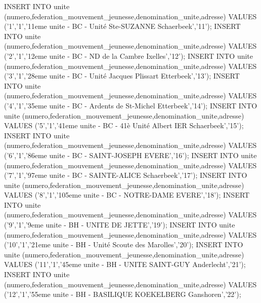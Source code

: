 INSERT INTO unite (numero,federation_mouvement_jeunesse,denomination_unite,adresse) VALUES ('1','1','11eme unite - BC - Unité Ste-SUZANNE Schaerbeek','11');
INSERT INTO unite (numero,federation_mouvement_jeunesse,denomination_unite,adresse) VALUES ('2','1','12eme unite - BC - ND de la Cambre Ixelles','12');
INSERT INTO unite (numero,federation_mouvement_jeunesse,denomination_unite,adresse) VALUES ('3','1','28eme unite - BC - Unité Jacques Plissart Etterbeek','13');
INSERT INTO unite (numero,federation_mouvement_jeunesse,denomination_unite,adresse) VALUES ('4','1','35eme unite - BC - Ardents de St-Michel Etterbeek','14');
INSERT INTO unite (numero,federation_mouvement_jeunesse,denomination_unite,adresse) VALUES ('5','1','41eme unite - BC - 41è Unité Albert IER Schaerbeek','15');
INSERT INTO unite (numero,federation_mouvement_jeunesse,denomination_unite,adresse) VALUES ('6','1','86eme unite - BC - SAINT-JOSEPH  EVERE','16');
INSERT INTO unite (numero,federation_mouvement_jeunesse,denomination_unite,adresse) VALUES ('7','1','97eme unite - BC - SAINTE-ALICE Schaerbeek','17');
INSERT INTO unite (numero,federation_mouvement_jeunesse,denomination_unite,adresse) VALUES ('8','1','105eme unite - BC - NOTRE-DAME EVERE','18');
INSERT INTO unite (numero,federation_mouvement_jeunesse,denomination_unite,adresse) VALUES ('9','1','9eme unite - BH - UNITE DE JETTE','19');
INSERT INTO unite (numero,federation_mouvement_jeunesse,denomination_unite,adresse) VALUES ('10','1','21eme unite - BH - Unité Scoute des Marolles','20');
INSERT INTO unite (numero,federation_mouvement_jeunesse,denomination_unite,adresse) VALUES ('11','1','45eme unite - BH - UNITE SAINT-GUY Anderlecht','21');
INSERT INTO unite (numero,federation_mouvement_jeunesse,denomination_unite,adresse) VALUES ('12','1','55eme unite - BH - BASILIQUE KOEKELBERG Ganshoren','22');

